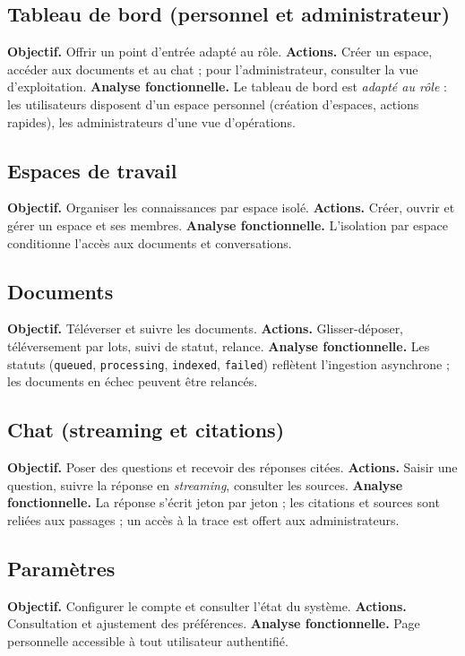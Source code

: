 \subsection{Tableau de bord (personnel et administrateur)}
\textbf{Objectif.} Offrir un point d'entrée adapté au rôle. \textbf{Actions.}
Créer un espace, accéder aux documents et au chat ; pour l'administrateur,
consulter la vue d'exploitation. \textbf{Analyse fonctionnelle.} Le tableau de
bord est \emph{adapté au rôle} : les utilisateurs disposent d'un espace personnel
(création d'espaces, actions rapides), les administrateurs d'une vue d'opérations.

\subsection{Espaces de travail}
\textbf{Objectif.} Organiser les connaissances par espace isolé. \textbf{Actions.}
Créer, ouvrir et gérer un espace et ses membres. \textbf{Analyse fonctionnelle.}
L'isolation par espace conditionne l'accès aux documents et conversations.

\subsection{Documents}
\textbf{Objectif.} Téléverser et suivre les documents. \textbf{Actions.}
Glisser-déposer, téléversement par lots, suivi de statut, relance.
\textbf{Analyse fonctionnelle.} Les statuts (\texttt{queued}, \texttt{processing},
\texttt{indexed}, \texttt{failed}) reflètent l'ingestion asynchrone ; les
documents en échec peuvent être relancés.

\subsection{Chat (streaming et citations)}
\textbf{Objectif.} Poser des questions et recevoir des réponses citées.
\textbf{Actions.} Saisir une question, suivre la réponse en \emph{streaming},
consulter les sources. \textbf{Analyse fonctionnelle.} La réponse s'écrit jeton
par jeton ; les citations et sources sont reliées aux passages ; un accès à la
trace est offert aux administrateurs.

\subsection{Paramètres}
\textbf{Objectif.} Configurer le compte et consulter l'état du système.
\textbf{Actions.} Consultation et ajustement des préférences.
\textbf{Analyse fonctionnelle.} Page personnelle accessible à tout utilisateur
authentifié.

